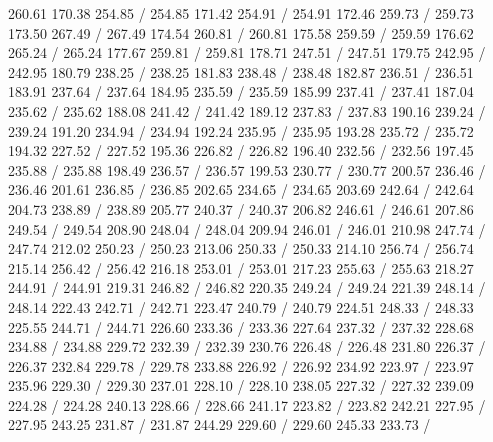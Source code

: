 { 260.61 170.38 254.85 /
 254.85 171.42 254.91 /
 254.91 172.46 259.73 /
 259.73 173.50 267.49 /
 267.49 174.54 260.81 /
 260.81 175.58 259.59 /
 259.59 176.62 265.24 /
 265.24 177.67 259.81 /
 259.81 178.71 247.51 /
 247.51 179.75 242.95 /
 242.95 180.79 238.25 /
 238.25 181.83 238.48 /
 238.48 182.87 236.51 /
 236.51 183.91 237.64 /
 237.64 184.95 235.59 /
 235.59 185.99 237.41 /
 237.41 187.04 235.62 /
 235.62 188.08 241.42 /
 241.42 189.12 237.83 /
 237.83 190.16 239.24 /
 239.24 191.20 234.94 /
 234.94 192.24 235.95 /
 235.95 193.28 235.72 /
 235.72 194.32 227.52 /
 227.52 195.36 226.82 /
 226.82 196.40 232.56 /
 232.56 197.45 235.88 /
 235.88 198.49 236.57 /
 236.57 199.53 230.77 /
 230.77 200.57 236.46 /
 236.46 201.61 236.85 /
 236.85 202.65 234.65 /
 234.65 203.69 242.64 /
 242.64 204.73 238.89 /
 238.89 205.77 240.37 /
 240.37 206.82 246.61 /
 246.61 207.86 249.54 /
 249.54 208.90 248.04 /
 248.04 209.94 246.01 /
 246.01 210.98 247.74 /
 247.74 212.02 250.23 /
 250.23 213.06 250.33 /
 250.33 214.10 256.74 /
 256.74 215.14 256.42 /
 256.42 216.18 253.01 /
 253.01 217.23 255.63 /
 255.63 218.27 244.91 /
 244.91 219.31 246.82 /
 246.82 220.35 249.24 /
 249.24 221.39 248.14 /
 248.14 222.43 242.71 /
 242.71 223.47 240.79 /
 240.79 224.51 248.33 /
 248.33 225.55 244.71 /
 244.71 226.60 233.36 /
 233.36 227.64 237.32 /
 237.32 228.68 234.88 /
 234.88 229.72 232.39 /
 232.39 230.76 226.48 /
 226.48 231.80 226.37 /
 226.37 232.84 229.78 /
 229.78 233.88 226.92 /
 226.92 234.92 223.97 /
 223.97 235.96 229.30 /
 229.30 237.01 228.10 /
 228.10 238.05 227.32 /
 227.32 239.09 224.28 /
 224.28 240.13 228.66 /
 228.66 241.17 223.82 /
 223.82 242.21 227.95 /
 227.95 243.25 231.87 /
 231.87 244.29 229.60 /
 229.60 245.33 233.73 /
}
